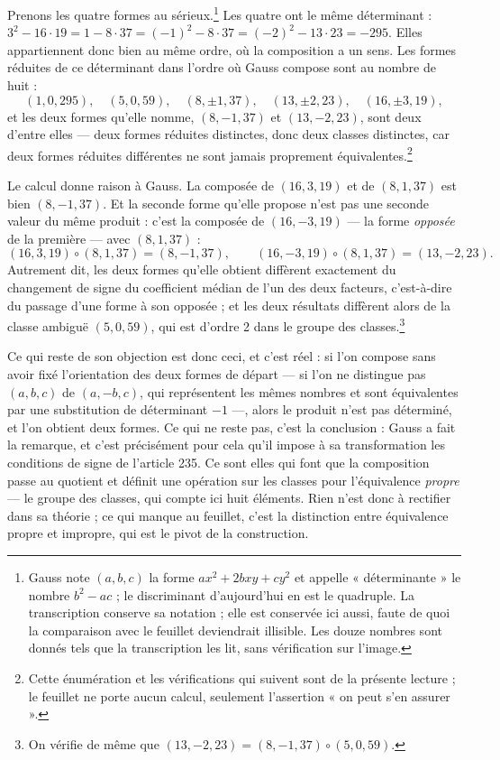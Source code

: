 \documentclass[11pt,a4paper]{article}
\begin{document}
Prenons les quatre formes au sérieux.\footnote{Gauss note $(a,b,c)$ la forme
$ax^2 + 2bxy + cy^2$ et appelle « déterminante » le nombre $b^2 - ac$ ; le
discriminant d'aujourd'hui en est le quadruple. La transcription conserve sa
notation ; elle est conservée ici aussi, faute de quoi la comparaison avec le
feuillet deviendrait illisible. Les douze nombres sont donnés tels que la
transcription les lit, sans vérification sur l'image.} Les quatre ont le même
déterminant : $3^2 - 16\cdot 19 = 1 - 8\cdot 37 = (-1)^2 - 8\cdot 37 =
(-2)^2 - 13\cdot 23 = -295$. Elles appartiennent donc bien au même ordre, où
la composition a un sens. Les formes réduites de ce déterminant dans l'ordre
où Gauss compose sont au nombre de huit :
\[
  (1,0,295),\quad (5,0,59),\quad (8,\pm 1,37),\quad (13,\pm 2,23),\quad
  (16,\pm 3,19),
\]
et les deux formes qu'elle nomme, $(8,-1,37)$ et $(13,-2,23)$, sont deux
d'entre elles — deux formes réduites distinctes, donc deux classes distinctes,
car deux formes réduites différentes ne sont jamais proprement
équivalentes.\footnote{Cette énumération et les vérifications qui suivent sont
de la présente lecture ; le feuillet ne porte aucun calcul, seulement
l'assertion « on peut s'en assurer ».}

Le calcul donne raison à Gauss. La composée de $(16,3,19)$ et de $(8,1,37)$
est bien $(8,-1,37)$. Et la seconde forme qu'elle propose n'est pas une
seconde valeur du même produit : c'est la composée de $(16,-3,19)$ — la forme
\emph{opposée} de la première — avec $(8,1,37)$ :
\[
  (16,3,19) \circ (8,1,37) = (8,-1,37),
  \qquad
  (16,-3,19) \circ (8,1,37) = (13,-2,23).
\]
Autrement dit, les deux formes qu'elle obtient diffèrent exactement du
changement de signe du coefficient médian de l'un des deux facteurs,
c'est-à-dire du passage d'une forme à son opposée ; et les deux résultats
diffèrent alors de la classe ambiguë $(5,0,59)$, qui est d'ordre 2 dans le groupe des
classes.\footnote{On vérifie de même que
$(13,-2,23) = (8,-1,37) \circ (5,0,59)$.}

Ce qui reste de son objection est donc ceci, et c'est réel : si l'on compose
sans avoir fixé l'orientation des deux formes de départ — si l'on ne distingue
pas $(a,b,c)$ de $(a,-b,c)$, qui représentent les mêmes nombres et sont
équivalentes par une substitution de déterminant $-1$ —, alors le produit
n'est pas déterminé, et l'on obtient deux formes. Ce qui ne reste pas, c'est
la conclusion : Gauss a fait la remarque, et c'est précisément pour cela qu'il
impose à sa transformation les conditions de signe de l'article 235. Ce sont
elles qui font que la composition passe au quotient et définit une opération
sur les classes pour l'équivalence \emph{propre} — le groupe des classes, qui
compte ici huit éléments. Rien n'est donc à rectifier dans
sa théorie ; ce qui manque au feuillet, c'est la distinction entre équivalence
propre et impropre, qui est le pivot de la construction.
\end{document}
